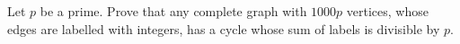 Let $p$ be a prime. Prove that any complete graph with $1000p$ vertices, whose edges are labelled with integers, has a cycle whose sum of labels is divisible by $p$.